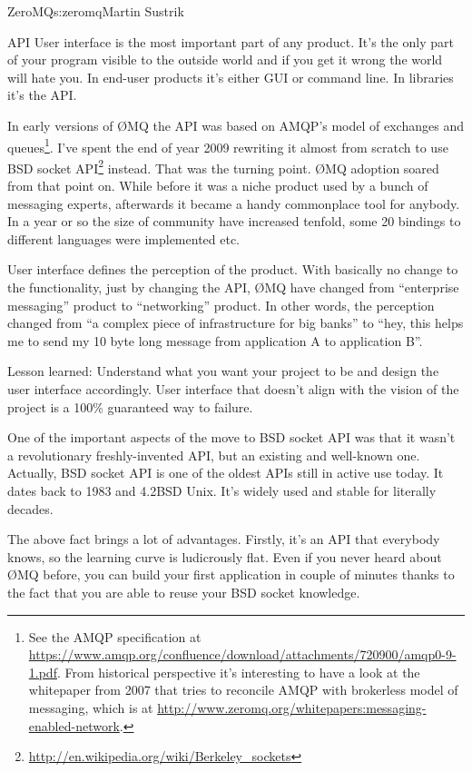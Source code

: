 \begin{aosachapter}{ZeroMQ}{s:zeromq}{Martin Sustrik}
\begin{aosasect1}{API}
User interface is the most important part of any product. It's the
only part of your program visible to the outside world and if you get
it wrong the world will hate you. In end-user products it's either GUI
or command line. In libraries it's the API.

In early versions of ØMQ the API was based on AMQP's model of
exchanges and queues\footnote{See the AMQP specification at
  \url{https://www.amqp.org/confluence/download/attachments/720900/amqp0-9-1.pdf}. From
  historical perspective it's interesting to have a look at the
  whitepaper from 2007 that tries to reconcile AMQP with brokerless
  model of messaging, which is at
  \url{http://www.zeromq.org/whitepapers:messaging-enabled-network}.}. I've
spent the end of year 2009 rewriting it almost from scratch to use BSD
socket
API\footnote{\url{http://en.wikipedia.org/wiki/Berkeley\_sockets}}
instead. That was the turning point. ØMQ adoption soared from that
point on. While before it was a niche product used by a bunch of
messaging experts, afterwards it became a handy commonplace tool for
anybody. In a year or so the size of community have increased tenfold,
some 20 bindings to different languages were implemented etc.

User interface defines the perception of the product. With basically
no change to the functionality, just by changing the API, ØMQ have
changed from ``enterprise messaging'' product to ``networking''
product. In other words, the perception changed from ``a complex piece
of infrastructure for big banks'' to ``hey, this helps me to send my
10 byte long message from application A to application B''.

Lesson learned: Understand what you want your project to be and design
the user interface accordingly. User interface that doesn't align with
the vision of the project is a 100\% guaranteed way to failure.

One of the important aspects of the move to BSD socket API was that it
wasn't a revolutionary freshly-invented API, but an existing and
well-known one. Actually, BSD socket API is one of the oldest APIs
still in active use today. It dates back to 1983 and 4.2BSD Unix. It's
widely used and stable for literally decades.

The above fact brings a lot of advantages.  Firstly, it's an API that
everybody knows, so the learning curve is ludicrously flat. Even if
you never heard about ØMQ before, you can build your first application
in couple of minutes thanks to the fact that you are able to reuse
your BSD socket knowledge.


\end{aosasect1}
\end{aosachapter}
